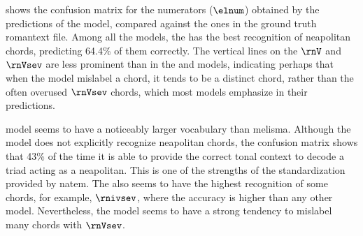 

 shows the confusion
matrix for the numerators ($\elnum$) obtained by the
predictions of the \textcite{micchi2021deep} model, compared
against the ones in the ground truth \gls{romantext} file.
Among all the models, the \textcite{micchi2021deep} has the
best recognition of \gls{neapolitan} chords, predicting
64.4\% of them correctly. The vertical lines on the $\rnV$
and $\rnVsev$ are less prominent than in the
\textcite{chen2021attend} and \textcite{mcleod2021modular}
models, indicating perhaps that when the model mislabel a
chord, it tends to be a distinct chord, rather than the
often overused $\rnVsev$ chords, which most models emphasize
in their predictions.


model seems to have a noticeably larger vocabulary than
\gls{melisma}. Although the model does not explicitly
recognize \gls{neapolitan} chords, the confusion matrix
shows that 43\% of the time it is able to provide the
correct tonal context to decode a triad acting as a
\gls{neapolitan}. This is one of the strengths of the
standardization provided by \gls{natem}. The
\textcite{chen2021attend} also seems to have the highest
recognition of some chords, for example, $\rnivsev$, where
the accuracy is higher than any other model. Nevertheless,
the model seems to have a strong tendency to mislabel many
chords with $\rnVsev$.




